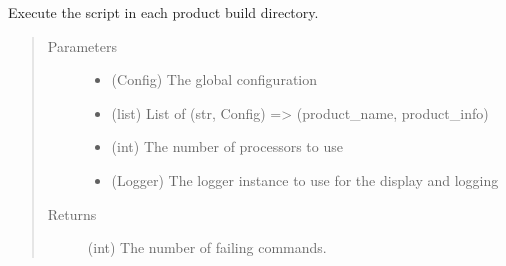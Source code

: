 \documentclass[a4paper,10pt,english]{sphinxmanual}
\begin{document}
\begin{fulllineitems}
\label{\detokenize{apidoc_commands/commands:commands.script.run_script_all_products}}
Execute the script in each product build directory.
\begin{quote}\begin{description}
\item[{Parameters}] \leavevmode\begin{itemize}
\item {} 
 \textendash{} (Config) The global configuration

\item {} 
 \textendash{} (list) 
List of (str, Config) =\textgreater{} (product\_name, product\_info)

\item {} 
 \textendash{} (int) The number of processors to use

\item {} 
 \textendash{} (Logger) 
The logger instance to use for the display and logging

\end{itemize}

\item[{Returns}] \leavevmode
(int) The number of failing commands.

\end{description}\end{quote}

\end{fulllineitems}

\end{document}
